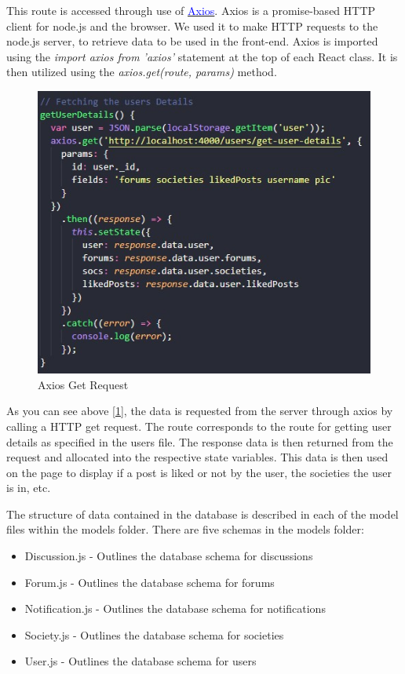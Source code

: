 This route is accessed through use of \href{https://github.com/axios/axios}{\textcolor{blue}{Axios}}. Axios is a promise-based HTTP client for node.js and the browser. We used it to make HTTP requests to the node.js server, to retrieve data to be used in the front-end. Axios is imported using the \textit{import axios from 'axios'} statement at the top of each React class. It is then utilized using the \textit{axios.get(route, {params})} method.

\begin{figure}[H]
  \centering
  \includegraphics[scale=0.7]{img/get-user-details-axios.jpg}
  \caption{Axios Get Request}
  \label{fig:Get Axios Route}
\end{figure}

As you can see above [\ref{fig:Get Axios Route}], the data is requested from the server through axios by calling a HTTP get request. The route corresponds to the route for getting user details as specified in the users file. The response data is then returned from the request and allocated into the respective state variables. This data is then used on the page to display if a post is liked or not by the user, the societies the user is in, etc.

The structure of data contained in the database is described in each of the model files within the models folder. There are five schemas in the models folder:

\begin{itemize}
    \item Discussion.js - Outlines the database schema for discussions
    \item Forum.js - Outlines the database schema for forums
    \item Notification.js - Outlines the database schema for notifications
    \item Society.js - Outlines the database schema for societies
    \item User.js - Outlines the database schema for users
\end{itemize}

